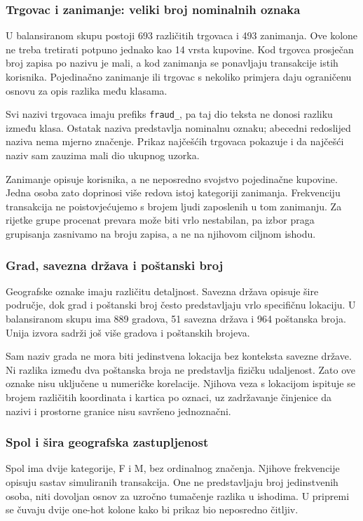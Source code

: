 \subsubsection*{Trgovac i zanimanje: veliki broj nominalnih oznaka}
U balansiranom skupu postoji 693 različitih trgovaca i 493 zanimanja. Ove kolone
ne treba tretirati potpuno jednako kao 14 vrsta kupovine. Kod trgovca prosječan
broj zapisa po nazivu je mali, a kod zanimanja se ponavljaju transakcije istih
korisnika. Pojedinačno zanimanje ili trgovac s nekoliko primjera daju ograničenu
osnovu za opis razlika među klasama.

Svi nazivi trgovaca imaju prefiks \texttt{fraud\_}, pa taj dio teksta ne
donosi razliku između klasa. Ostatak naziva predstavlja nominalnu oznaku;
abecedni redoslijed naziva nema mjerno značenje. Prikaz najčešćih trgovaca
pokazuje i da najčešći naziv sam zauzima mali dio ukupnog uzorka.

Zanimanje opisuje korisnika, a ne neposredno svojstvo pojedinačne kupovine.
Jedna osoba zato doprinosi više redova istoj kategoriji zanimanja. Frekvenciju
transakcija ne poistovjećujemo s brojem ljudi zaposlenih u tom zanimanju.
Za rijetke grupe procenat prevara može biti vrlo nestabilan, pa izbor praga
grupisanja zasnivamo na broju zapisa, a ne na njihovom ciljnom ishodu.


\subsubsection*{Grad, savezna država i poštanski broj}
Geografske oznake imaju različitu detaljnost. Savezna država opisuje šire područje,
dok grad i poštanski broj često predstavljaju vrlo specifičnu lokaciju. U
balansiranom skupu ima 889 gradova, 51 savezna država i 964 poštanska broja.
Unija izvora sadrži još više gradova i poštanskih brojeva.

Sam naziv grada ne mora biti jedinstvena lokacija bez konteksta savezne države.
Ni razlika između dva poštanska broja ne predstavlja fizičku udaljenost.
Zato ove oznake nisu uključene u numeričke korelacije. Njihova veza s lokacijom
ispituje se brojem različitih koordinata i kartica po oznaci, uz zadržavanje
činjenice da nazivi i prostorne granice nisu savršeno jednoznačni.


\subsubsection*{Spol i šira geografska zastupljenost}
Spol ima dvije kategorije, F i M, bez ordinalnog značenja. Njihove frekvencije
opisuju sastav simuliranih transakcija. One ne predstavljaju broj jedinstvenih
osoba, niti dovoljan osnov za uzročno tumačenje razlika u ishodima.
U pripremi se čuvaju dvije one-hot kolone kako bi prikaz bio neposredno čitljiv.

